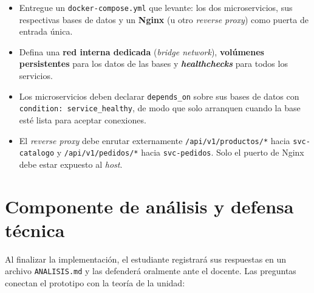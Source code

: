 \documentclass[11pt,a4paper]{article}
\begin{document}
\begin{itemize}[leftmargin=1.2em, itemsep=0.25em]
    \item Entregue un \texttt{docker-compose.yml} que levante: los dos microservicios, sus respectivas bases de datos y un \textbf{Nginx} (u otro \emph{reverse proxy}) como puerta de entrada única.
    \item Defina una \textbf{red interna dedicada} (\emph{bridge network}), \textbf{volúmenes persistentes} para los datos de las bases y \textbf{\emph{healthchecks}} para todos los servicios.
    \item Los microservicios deben declarar \texttt{depends\_on} sobre sus bases de datos con \texttt{condition:\ service\_healthy}, de modo que solo arranquen cuando la base esté lista para aceptar conexiones.
    \item El \emph{reverse proxy} debe enrutar externamente \texttt{/api/v1/productos/*} hacia \texttt{svc-catalogo} y \texttt{/api/v1/pedidos/*} hacia \texttt{svc-pedidos}. Solo el puerto de Nginx debe estar expuesto al \emph{host}.
\end{itemize}

\section{Componente de análisis y defensa técnica}

Al finalizar la implementación, el estudiante registrará sus respuestas en un archivo \texttt{ANALISIS.md} y las defenderá oralmente ante el docente. Las preguntas conectan el prototipo con la teoría de la unidad:
\end{document}
